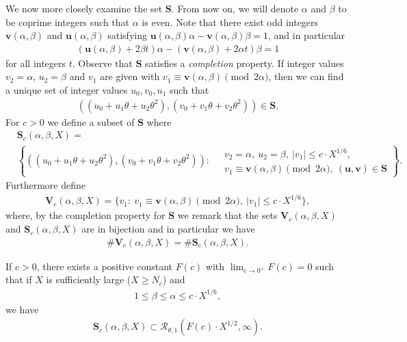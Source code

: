 \documentclass[12pt]{amsart}
\newcommand{\1}{\mathmybb{1}}
\begin{document}
We now more closely examine the set $\mathbf{S}$. From now on, we will denote $\alpha$ and $\beta$ to be coprime integers such that $\alpha$ is even. Note that there exist odd integers $\mathbf{v}(\alpha,\beta)$ and $\mathbf{u}(\alpha,\beta)$ satisfying $\mathbf{u}(\alpha,\beta) \alpha - \mathbf{v}(\alpha,\beta) \beta = 1$, and in particular 
\begin{align*}
(\mathbf{u}(\alpha,\beta)+2\beta t) \alpha - (\mathbf{v}(\alpha,\beta)+2\alpha t) \beta = 1
\end{align*}
for all integers $t$. Observe that $\mathbf{S}$ satisfies a \textit{completion} property. If integer values $v_{2} = \alpha$, $u_{2} = \beta$ and $v_{1}$ are given with $v_{1} \equiv \mathbf{v}(\alpha,\beta) \pmod{2\alpha}$, then we can find a unique set of integer values $u_{0},v_{0},u_{1}$ such that 
\begin{align*}
((u_{0}+u_{1}\theta+u_{2}\theta^2), (v_{0}+v_{1}\theta+v_{2}\theta^2)) \in \mathbf{S}.
\end{align*}
For $c>0$ we define a subset of $\mathbf{S}$ where 
\begin{align*}
&\mathbf{S}_{c}(\alpha,\beta,X) = \\
&\left\{((u_{0}+u_{1}\theta+u_{2}\theta^2), (v_{0}+v_{1}\theta+v_{2}\theta^2)): \ 
\begin{aligned}
&v_{2} = \alpha, \  u_{2}=\beta, \ |v_{1}| \leq c\cdot X^{1/6}, \\
&v_{1}\equiv \mathbf{v}(\alpha,\beta) \pmod{2\alpha}, \ (\mathbf{u},\mathbf{v})\in \mathbf{S}
\end{aligned}
\right\}.
\end{align*}
Furthermore define 
\begin{align*}
\mathbf{V}_{c}(\alpha,\beta,X) = \{v_{1}: \ v_{1} \equiv \mathbf{v}(\alpha,\beta) \pmod{2\alpha}, \ |v_{1}| \leq c\cdot X^{1/6}\},
\end{align*}
where, by the completion property for $\mathbf{S}$ we remark that the sets $\mathbf{V}_{c}(\alpha,\beta,X)$ and $\mathbf{S}_{c}(\alpha,\beta,X)$ are in bijection and in particular we have
\begin{align}
\label{VcScsamecardinalitysum2squares}
\# \mathbf{V}_{c}(\alpha,\beta,X) = \# \mathbf{S}_{c}(\alpha,\beta,X).
\end{align}
\begin{lem}
\label{betaalphaauxlemmasum2squares}
If $c>0$, there exists a positive constant $F(c)$ with $\lim_{c\rightarrow 0^{+}}F(c) = 0$ such that if $X$ is sufficiently large ($X \geq N_{c}$) and 
\begin{align*}
1\leq \beta \leq \alpha \leq c\cdot X^{1/6},
\end{align*}
we have  
\begin{align*}
\mathbf{S}_{c}(\alpha,\beta,X) \subset \mathcal{R}_{\theta,1}(F(c)\cdot X^{1/2},\infty).
\end{align*}
\end{lem}
\end{document}
